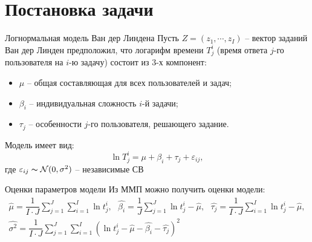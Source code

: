 \documentclass[aspectratio=169]{beamer}
\begin{document}
    \section{Постановка задачи}
    \begin{frame}{Логнормальная модель Ван дер Линдена}
            Пусть $Z=(z_1,\cdots,z_I)$ -- вектор заданий\\
            Ван дер Линден предположил, что логарифм времени $T_j^i$ (время ответа $j$-го пользователя на $i$-ю задачу) состоит из 3-х компонент:
            \begin{itemize}
                \item $\mu$ -- общая составляющая для всех пользователей и задач;
                \item $\beta_i$ -- индивидуальная сложность $i$-й задачи;
                \item $\tau_j$ -- особенности $j$-го пользователя, решающего задание.
            \end{itemize}
            Модель имеет вид:
            \begin{equation}
            \ln T_j^i = \mu + \beta_i + \tau_j + \varepsilon_{ij},
            \end{equation}
            где $\varepsilon_{ij} \thicksim \mathcal{N}(0,\sigma^2)$ -- независимые СВ
    \end{frame}


    \begin{frame}{Оценки параметров модели}
            Из ММП можно получить оценки модели:
            \begin{gather}
                \hat{\mu} = \dfrac{1}{I \cdot J} \sum\limits_{j=1}^J \sum\limits_{i=1}^I \ln t_j^i, ~~~  \hat{\beta_i} = \dfrac{1}{J} \sum\limits_{j=1}^J \ln t_j^i - \hat{\mu}, ~~~  \hat{\tau_j} = \dfrac{1}{I \cdot J} \sum\limits_{i=1}^I \ln t_j^i - \hat{\mu},\\
                \hat{\sigma^2} = \dfrac{1}{I \cdot J} \sum\limits_{j=1}^J \sum\limits_{i=1}^I \left( \ln t_j^i - \hat{\mu} - \hat{\beta_i} - \hat{\tau_j} \right)^2
            \end{gather}
    \end{frame}
\end{document}
